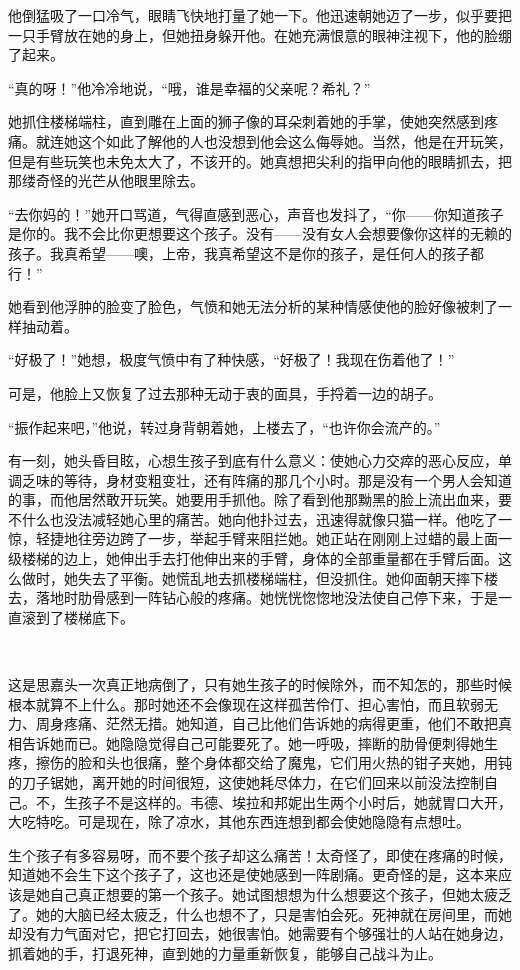 \par 他倒猛吸了一口冷气，眼睛飞快地打量了她一下。他迅速朝她迈了一步，似乎要把一只手臂放在她的身上，但她扭身躲开他。在她充满恨意的眼神注视下，他的脸绷了起来。
\par “真的呀！”他冷冷地说，“哦，谁是幸福的父亲呢？希礼？”
\par 她抓住楼梯端柱，直到雕在上面的狮子像的耳朵刺着她的手掌，使她突然感到疼痛。就连她这个如此了解他的人也没想到他会这么侮辱她。当然，他是在开玩笑，但是有些玩笑也未免太大了，不该开的。她真想把尖利的指甲向他的眼睛抓去，把那缕奇怪的光芒从他眼里除去。
\par “去你妈的！”她开口骂道，气得直感到恶心，声音也发抖了，“你——你知道孩子是你的。我不会比你更想要这个孩子。没有——没有女人会想要像你这样的无赖的孩子。我真希望——噢，上帝，我真希望这不是你的孩子，是任何人的孩子都行！”
\par 她看到他浮肿的脸变了脸色，气愤和她无法分析的某种情感使他的脸好像被刺了一样抽动着。
\par “好极了！”她想，极度气愤中有了种快感，“好极了！我现在伤着他了！”
\par 可是，他脸上又恢复了过去那种无动于衷的面具，手捋着一边的胡子。
\par “振作起来吧，”他说，转过身背朝着她，上楼去了，“也许你会流产的。”
\par 有一刻，她头昏目眩，心想生孩子到底有什么意义：使她心力交瘁的恶心反应，单调乏味的等待，身材变粗变壮，还有阵痛的那几个小时。那是没有一个男人会知道的事，而他居然敢开玩笑。她要用手抓他。除了看到他那黝黑的脸上流出血来，要不什么也没法减轻她心里的痛苦。她向他扑过去，迅速得就像只猫一样。他吃了一惊，轻捷地往旁边跨了一步，举起手臂来阻拦她。她正站在刚刚上过蜡的最上面一级楼梯的边上，她伸出手去打他伸出来的手臂，身体的全部重量都在手臂后面。这么做时，她失去了平衡。她慌乱地去抓楼梯端柱，但没抓住。她仰面朝天摔下楼去，落地时肋骨感到一阵钻心般的疼痛。她恍恍惚惚地没法使自己停下来，于是一直滚到了楼梯底下。
\par  
\par 这是思嘉头一次真正地病倒了，只有她生孩子的时候除外，而不知怎的，那些时候根本就算不上什么。那时她还不会像现在这样孤苦伶仃、担心害怕，而且软弱无力、周身疼痛、茫然无措。她知道，自己比他们告诉她的病得更重，他们不敢把真相告诉她而已。她隐隐觉得自己可能要死了。她一呼吸，摔断的肋骨便刺得她生疼，擦伤的脸和头也很痛，整个身体都交给了魔鬼，它们用火热的钳子夹她，用钝的刀子锯她，离开她的时间很短，这使她耗尽体力，在它们回来以前没法控制自己。不，生孩子不是这样的。韦德、埃拉和邦妮出生两个小时后，她就胃口大开，大吃特吃。可是现在，除了凉水，其他东西连想到都会使她隐隐有点想吐。
\par 生个孩子有多容易呀，而不要个孩子却这么痛苦！太奇怪了，即使在疼痛的时候，知道她不会生下这个孩子了，这也还是使她感到一阵剧痛。更奇怪的是，这本来应该是她自己真正想要的第一个孩子。她试图想想为什么想要这个孩子，但她太疲乏了。她的大脑已经太疲乏，什么也想不了，只是害怕会死。死神就在房间里，而她却没有力气面对它，把它打回去，她很害怕。她需要有个够强壮的人站在她身边，抓着她的手，打退死神，直到她的力量重新恢复，能够自己战斗为止。
